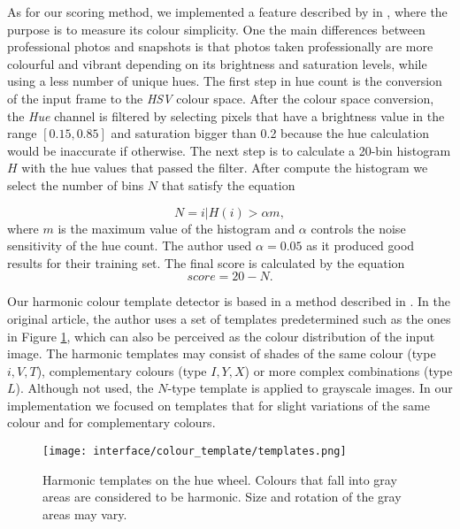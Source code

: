 As for our scoring method, we implemented a feature described by \citeauthor{ke2006design} in \cite{ke2006design}, where the purpose is to measure its colour simplicity. One the main differences between professional photos and snapshots is that photos taken professionally are more colourful and vibrant depending on its brightness and saturation levels, while using a less number of unique hues. The first step in hue count is the conversion of the input frame to the \emph{HSV} colour space. After the colour space conversion, the \emph{Hue} channel is filtered by selecting pixels that have a brightness value in the range $[0.15,0.85]$ and saturation bigger than 0.2 because the hue calculation would be inaccurate if otherwise. The next step is to calculate a 20-bin histogram $H$ with the hue values that passed the filter. After compute the histogram we select the number of bins $N$ that satisfy the equation

\begin{equation}
N = {i | H(i) > \alpha m},
\end{equation}
where $m$ is the maximum value of the histogram and $\alpha$ controls the noise sensitivity of the hue count. The author used $\alpha = 0.05$ as it produced good results for their training set. The final score is calculated by the equation
\begin{equation}
score = 20 - N.
\end{equation}

Our harmonic colour template detector is based in a method described in \cite{cohen2006color}. In the original article, the author uses a set of templates predetermined such as the ones in Figure \ref{fig:templates}, which can also be perceived as the colour distribution of the input image. The harmonic templates may consist of shades of the same colour (type $i, V, T$), complementary colours (type $I, Y, X$) or more complex combinations (type $L$). Although not used, the $N$-type template is applied to grayscale images. In our implementation we focused on templates that for slight variations of the same colour and for complementary colours.

\begin{figure}[htb]
	\centering
	\texttt{[image: interface/colour\_template/templates.png]}
  	\caption{Harmonic templates on the hue wheel. Colours that fall into gray areas are considered to be harmonic. Size and rotation of the gray areas may vary.}
	\label{fig:templates}
\end{figure}

